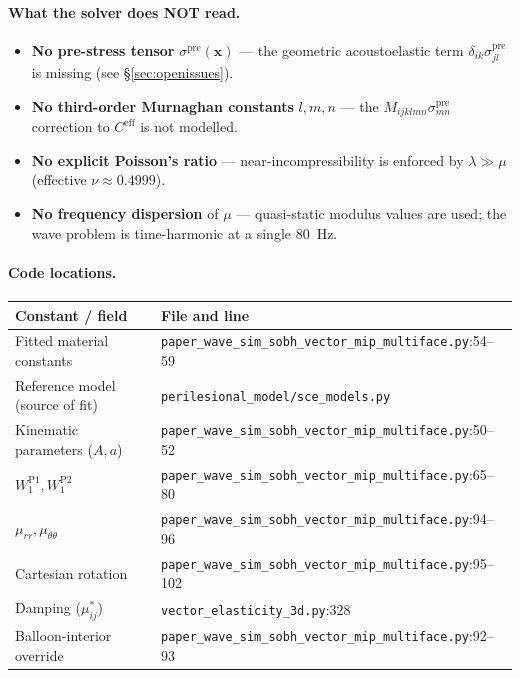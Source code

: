 \documentclass[11pt,letterpaper]{article}
\newcommand{\vect}[1]{\boldsymbol{#1}}
\begin{document}
\paragraph{What the solver does NOT read.}
\begin{itemize}
\item \textbf{No pre-stress tensor} $\sigma^{\text{pre}}(\vect x)$
      — the geometric acoustoelastic term $\delta_{ik}\sigma^{\text{pre}}_{jl}$
      is missing (see \S\ref{sec:openissues}).
\item \textbf{No third-order Murnaghan constants} $l, m, n$ — the
      $M_{ijklmn}\sigma^{\text{pre}}_{mn}$ correction to $C^{\text{eff}}$
      is not modelled.
\item \textbf{No explicit Poisson's ratio} — near-incompressibility
      is enforced by $\lambda \gg \mu$ (effective $\nu \approx 0.4999$).
\item \textbf{No frequency dispersion} of $\mu$ — quasi-static
      modulus values are used; the wave problem is time-harmonic at
      a single \SI{80}{\hertz}.
\end{itemize}

\paragraph{Code locations.}

\begin{center}
\begin{tabular}{ll}
\toprule
Constant / field & File and line \\
\midrule
Fitted material constants          & \texttt{paper\_wave\_sim\_sobh\_vector\_mip\_multiface.py}:54--59 \\
Reference model (source of fit)    & \texttt{perilesional\_model/sce\_models.py} \\
Kinematic parameters ($A, a$)     & \texttt{paper\_wave\_sim\_sobh\_vector\_mip\_multiface.py}:50--52 \\
$W_1^{\text{P1}}, W_1^{\text{P2}}$ & \texttt{paper\_wave\_sim\_sobh\_vector\_mip\_multiface.py}:65--80 \\
$\mu_{rr}, \mu_{\theta\theta}$    & \texttt{paper\_wave\_sim\_sobh\_vector\_mip\_multiface.py}:94--96 \\
Cartesian rotation                & \texttt{paper\_wave\_sim\_sobh\_vector\_mip\_multiface.py}:95--102 \\
Damping ($\mu^{*}_{ij}$)          & \texttt{vector\_elasticity\_3d.py}:328 \\
Balloon-interior override         & \texttt{paper\_wave\_sim\_sobh\_vector\_mip\_multiface.py}:92--93 \\
\bottomrule
\end{tabular}
\end{center}
\end{document}
